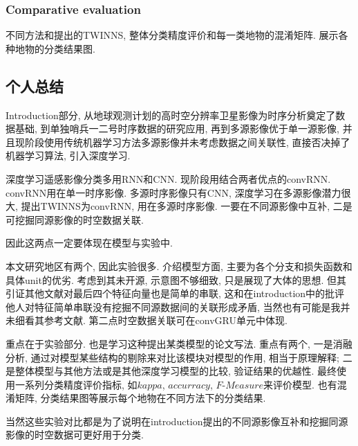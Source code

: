 \subsubsection{Comparative evaluation}
不同方法和提出的TWINNS, 整体分类精度评价和每一类地物的混淆矩阵. 展示各种地物的分类结果图.

\subsection{个人总结}
Introduction部分, 从地球观测计划的高时空分辨率卫星影像为时序分析奠定了数据基础, 到单独哨兵一二号时序数据的研究应用, 再到多源影像优于单一源影像, 并且现阶段使用传统机器学习方法多源影像并未考虑数据之间关联性, 直接否决掉了机器学习算法, 引入深度学习. 

深度学习遥感影像分类多用RNN和CNN. 现阶段用结合两者优点的convRNN. convRNN用在单一时序影像. 多源时序影像只有CNN, 深度学习在多源影像潜力很大, 提出TWINNS为convRNN, 用在多源时序影像. 一要在不同源影像中互补, 二是可挖掘同源影像的时空数据关联. 

因此这两点一定要体现在模型与实验中.

本文研究地区有两个, 因此实验很多. 介绍模型方面, 主要为各个分支和损失函数和具体unit的优劣. 考虑到其未开源, 示意图不够细致, 只是展现了大体的思想. 但其引证其他文献对最后四个特征向量也是简单的串联, 这和在introduction中的批评他人对特征简单串联没有挖掘不同源数据间的关联形成矛盾, 当然也有可能是我并未细看其参考文献. 第二点时空数据关联可在convGRU单元中体现.

重点在于实验部分. 也是学习这种提出某类模型的论文写法. 重点有两个, 一是消融分析, 通过对模型某些结构的剔除来对比该模块对模型的作用, 相当于原理解释; 二是整体模型与其他方法或是其他深度学习模型的比较, 验证结果的优越性. 最终使用一系列分类精度评价指标, 如$kappa$, $accurracy$, $F\text{-}Measure$来评价模型. 也有混淆矩阵, 分类结果图等展示每个地物在不同方法下的分类结果. 

当然这些实验对比都是为了说明在introduction提出的不同源影像互补和挖掘同源影像的时空数据可更好用于分类. 
